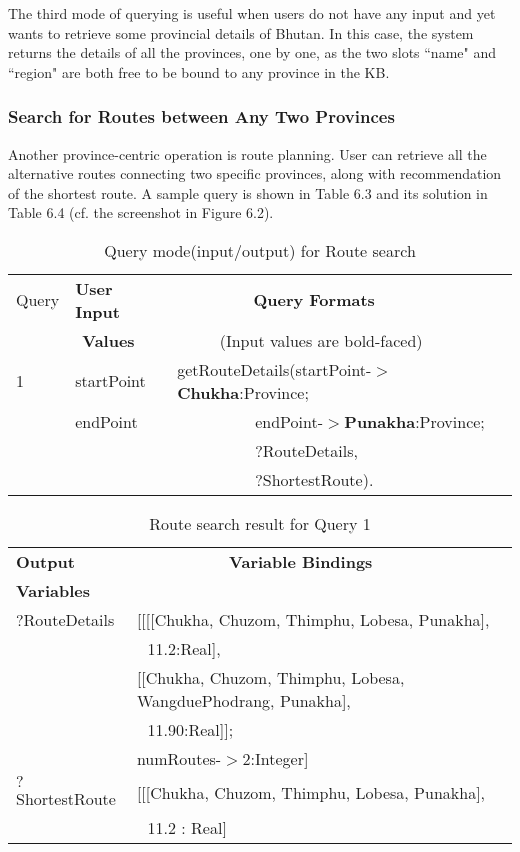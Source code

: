 \hspace{0.3in}The third mode of querying is useful when users do not have any input and yet wants to retrieve some provincial details of Bhutan. In this case, the system returns the details of all the provinces, one by one, as the two slots ``name" and ``region" are both free to be bound to any province in the KB.

\subsubsection{Search for Routes between Any Two Provinces}
\hspace{0.3in}Another province-centric operation is route planning. User can retrieve all the alternative routes connecting two specific provinces, along with recommendation of the shortest route. A sample query is shown in Table 6.3 and its solution in Table 6.4 (cf. the screenshot in Figure 6.2). 

\begin{table} [tbph]
\caption{Query mode(input/output) for Route search}
\centering
\footnotesize
\begin{tabular}{|l|l|l|}
\hline
Query &\textbf{User Input} &$~~~~~~~~~~~~~~~~~~~~$ \textbf{Query Formats} \\
 &$~~$\textbf{Values}   & $~~~~~~~~~~~~$(Input values are bold-faced)      \\
\hline
 1&startPoint &getRouteDetails(startPoint-$>$\textbf{Chukha}:Province;\\
  &endPoint   &$~~~~~~~~~~~~~~~~~~~~~~$endPoint-$>$\textbf{Punakha}:Province; \\
  &       &$~~~~~~~~~~~~~~~~~~~~~~?$RouteDetails,\\
  &       &$~~~~~~~~~~~~~~~~~~~~~~?$ShortestRoute).\\  
\hline
\end{tabular} 
\end{table}

\begin{table} [tbph]
\caption{Route search result for Query 1}
\centering
\footnotesize
\begin{tabular}{|l|l|}
\hline
 \textbf{Output} &$~~~~~~~~~~~~~~~~~~~~~~~~~~$\textbf{Variable Bindings} \\
 \textbf{Variables}&  \\
\hline
 $?$RouteDetails&[[[[Chukha, Chuzom, Thimphu, Lobesa, Punakha],\\
                &$~~~$11.2:Real], \\          
                &[[Chukha, Chuzom, Thimphu, Lobesa, WangduePhodrang, Punakha],\\
                &$~~~$11.90:Real]];\\
                &numRoutes-$>$2:Integer] \\
 \hline
 $?$ShortestRoute& [[[Chukha, Chuzom, Thimphu, Lobesa, Punakha], \\
                 &$~~~$11.2 : Real]\\
\hline
\end{tabular} 
\end{table}

